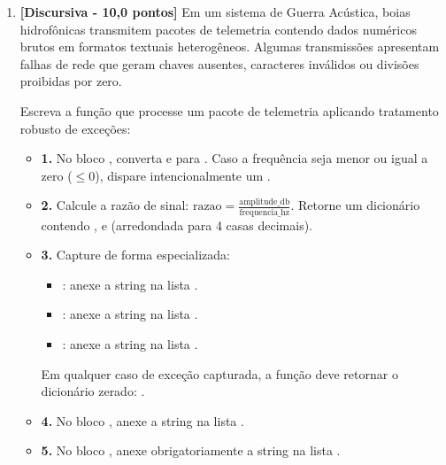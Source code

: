 \begin{enumerate}[label=\textbf{Q\arabic*.}]

\item \textbf{[Discursiva - 10,0 pontos]} Em um sistema de Guerra Acústica, boias hidrofônicas transmitem pacotes de telemetria contendo dados numéricos brutos em formatos textuais heterogêneos. Algumas transmissões apresentam falhas de rede que geram chaves ausentes, caracteres inválidos ou divisões proibidas por zero.

Escreva a função  que processe um pacote de telemetria aplicando tratamento robusto de exceções:
\begin{itemize}[leftmargin=*]
    \item \textbf{1.} No bloco , converta  e  para . Caso a frequência seja menor ou igual a zero ($\le 0$), dispare intencionalmente um .
    \item \textbf{2.} Calcule a razão de sinal: $\text{razao} = \frac{\text{amplitude\_db}}{\text{frequencia\_hz}}$. Retorne um dicionário contendo ,  e  (arredondada para 4 casas decimais).
    \item \textbf{3.} Capture de forma especializada:
    \begin{itemize}
        \item {}: anexe a string  na lista .
        \item {}: anexe a string  na lista .
        \item {}: anexe a string  na lista .
    \end{itemize}
    Em qualquer caso de exceção capturada, a função deve retornar o dicionário zerado: .
    \item \textbf{4.} No bloco , anexe a string  na lista .
    \item \textbf{5.} No bloco , anexe obrigatoriamente a string  na lista .
\end{itemize}


\end{enumerate}
